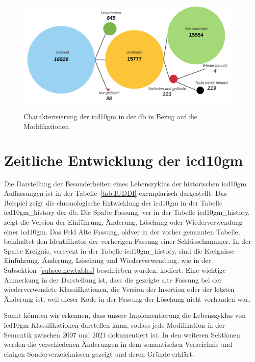  \begin{figure}[ht]
 	\centering
 	\includegraphics[height=6cm]{figures/icd10gm_quantities}
 	\caption[\acs{icd10gm} in der \acs{db}]{Charakterisierung der \acs{icd10gm} in der \ac{db} in Bezug auf die Modifikationen.}
 	\label{fig:icddb}
 \end{figure}

\section{Zeitliche Entwicklung der \acs{icd10gm}} \label{sec:timeicd}

Die Darstellung der Besonderheiten eines Lebenszyklus der historischen \ac{icd10gm} Auffassungen ist in der Tabelle~\ref{tab:IUDDI} exemplarisch dargestellt. Das Beispiel zeigt die chronologische Entwicklung der \ac{icd10gm} in der Tabelle \textsf{icd10gm\_history} der \ac{db}. Die Spalte Fassung, \textsf{ver} in der Tabelle \textsf{icd10gm\_history}, zeigt die Version der Einführung, Änderung, Löschung oder Wiederverwendung einer \ac{icd10gm}. Das Feld Alte Fassung, \textsf{oldver} in der vorher genannten Tabelle, beinhaltet den Identifikator der vorherigen Fassung einer Schlüsselnummer. In der Spalte Ereignis, \textsf{verevent} in der Tabelle \textsf{icd10gm\_history}, sind die Ereignisse Einführung, Änderung, Löschung und Wiederverwendung, wie in der Subsektion~\ref{subsec:newtables} beschrieben wurden, kodiert. Eine wichtige Anmerkung in der Darstellung ist, dass die gezeigte alte Fassung bei der wiederverwendete Klassifikationen, die Version der Insertion oder der letzten Änderung ist, weil dieser Kode in der Fassung der Löschung nicht vorhanden war.

Somit könnten wir erkennen, dass unsere Implementierung die Lebenszyklus von \ac{icd10gm} Klassifikationen darstellen kann, sodass jede Modifikation in der Semantik zwischen 2007 und 2021 dokumentiert ist. In den weiteren Sektionen werden die verschiedenen Änderungen in dem semantischen Verzeichnis und einigen Sonderverzeichnissen gezeigt und deren Gründe erklärt.

